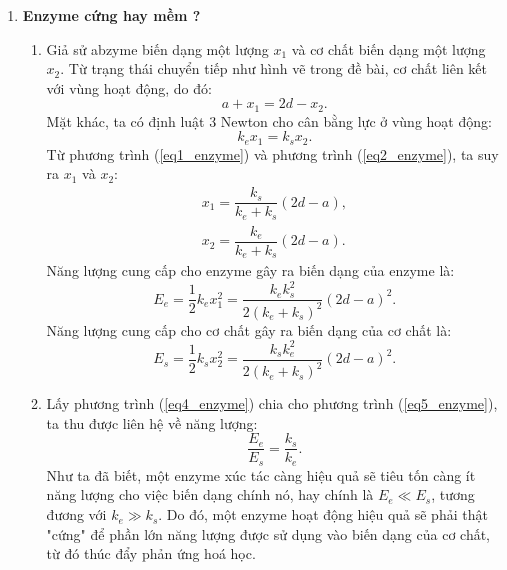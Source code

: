 \begin{enumerate} 
    \item  \textbf{Enzyme cứng hay mềm ?}\\
    \begin{enumerate}[label=\textbf{\alph*,}]\itemsep0em
        \item Giả sử abzyme biến dạng một lượng $x_1$ và cơ chất biến dạng một lượng $x_2$. Từ trạng thái chuyển tiếp như hình vẽ trong đề bài, cơ chất liên kết với vùng hoạt động, do đó:
        \begin{equation} \label{eq1_enzyme}
            a+x_1=2d-x_2.
        \end{equation}
        Mặt khác, ta có định luật 3 Newton cho cân bằng lực ở vùng hoạt động:
        \begin{equation} \label{eq2_enzyme}
            k_e x_1 = k_s x_2.
        \end{equation}
        Từ phương trình (\ref{eq1_enzyme}) và phương trình (\ref{eq2_enzyme}), ta suy ra $x_1$ và $x_2$:
        \begin{equation} \label{eq3_enzyme}
        \begin{split}
            x_1=\dfrac{k_s}{k_e+k_s}(2d-a),\\
            x_2=\dfrac{k_e}{k_e+k_s}(2d-a).
        \end{split}
        \end{equation}
        Năng lượng cung cấp cho enzyme gây ra biến dạng của enzyme là:
        \begin{equation} \label{eq4_enzyme}
            E_e=\dfrac{1}{2}k_e x_1^2 =  \dfrac{k_e k_s^2}{2(k_e+k_s)^2}(2d-a)^2. 
        \end{equation}
        Năng lượng cung cấp cho cơ chất gây ra biến dạng của cơ chất là:
        \begin{equation} \label{eq5_enzyme}
            E_s=\dfrac{1}{2}k_s x_2^2 =  \dfrac{k_s k_e^2}{2(k_e+k_s)^2}(2d-a)^2. 
        \end{equation}
    \item Lấy phương trình (\ref{eq4_enzyme}) chia cho phương trình (\ref{eq5_enzyme}), ta thu được liên hệ về năng lượng:
    \begin{equation} \label{eq6_enzyme}
        \dfrac{E_e}{E_s}=\dfrac{k_s}{k_e}.
    \end{equation}
    Như ta đã biết, một enzyme xúc tác càng hiệu quả sẽ tiêu tốn càng ít năng lượng cho việc biến dạng chính nó, hay chính là $E_e \ll E_s$, tương đương với $k_e \gg k_s$. Do đó, một enzyme hoạt động hiệu quả sẽ phải thật "cứng" để phần lớn năng lượng được sử dụng vào biến dạng của cơ chất, từ đó thúc đẩy phản ứng hoá học.\\

\end{enumerate}
\end{enumerate}
